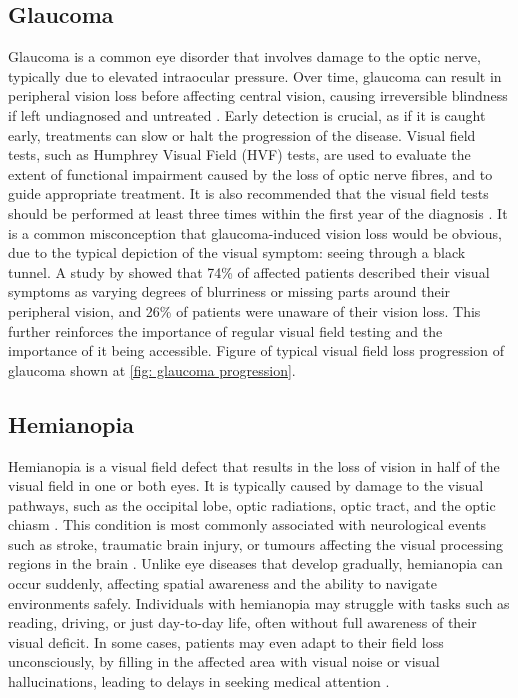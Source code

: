 \documentclass{l4proj}
\begin{document}
\subsection{Glaucoma}
Glaucoma is a common eye disorder that involves damage to the optic nerve, typically due to elevated intraocular pressure. Over time, glaucoma can result in peripheral vision loss before affecting central vision, causing irreversible blindness if left undiagnosed and untreated \citep{glaucoma1}. Early detection is crucial, as if it is caught early, treatments can slow or halt the progression of the disease. Visual field tests, such as Humphrey Visual Field (HVF) tests, are used to evaluate the extent of functional impairment caused by the loss of optic nerve fibres, and to guide appropriate treatment. It is also recommended that the visual field tests should be performed at least three times within the first year of the diagnosis \citep{glaucoma2}\citep{glaucoma2a}. It is a common misconception that glaucoma-induced vision loss would be obvious, due to the typical depiction of the visual symptom: seeing through a black tunnel. A study by \citep{glaucoma3} showed that 74\% of affected patients described their visual symptoms as varying degrees of blurriness or missing parts around their peripheral vision, and 26\% of patients were unaware of their vision loss. This further reinforces the importance of regular visual field testing and the importance of it being accessible. Figure of typical visual field loss progression of glaucoma shown at \ref{fig: glaucoma progression}.

\subsection{Hemianopia}
Hemianopia is a visual field defect that results in the loss of vision in half of the visual field in one or both eyes. It is typically caused by damage to the visual pathways, such as the occipital lobe, optic radiations, optic tract, and the optic chiasm \citep{hemanopia1}. This condition is most commonly associated with neurological events such as stroke, traumatic brain injury, or tumours affecting the visual processing regions in the brain \citep{hemanopia1}. Unlike eye diseases that develop gradually, hemianopia can occur suddenly, affecting spatial awareness and the ability to navigate environments safely. Individuals with hemianopia may struggle with tasks such as reading, driving, or just day-to-day life, often without full awareness of their visual deficit. In some cases, patients may even adapt to their field loss unconsciously, by filling in the affected area with visual noise or visual hallucinations, leading to delays in seeking medical attention \citep{hemanopia3}.
\end{document}

